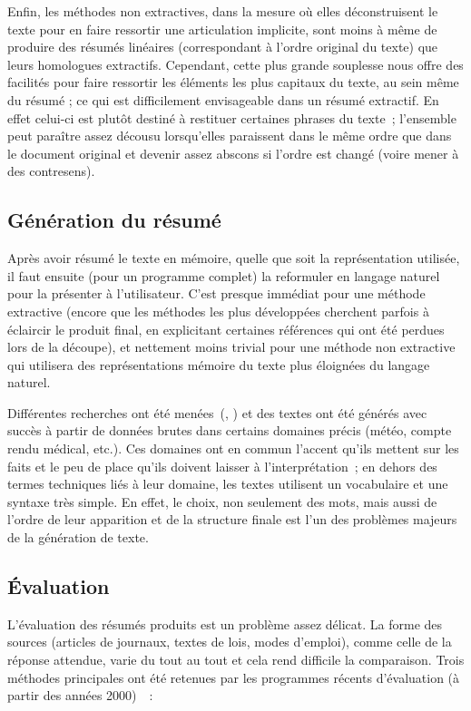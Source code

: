 \documentclass[a4paper, 12pt]{article}
\begin{document}
Enfin, les méthodes non extractives, dans la mesure où elles déconstruisent le texte pour en faire ressortir une articulation implicite, sont moins à même de produire des résumés linéaires (correspondant à l'ordre original du texte) que leurs homologues extractifs. Cependant, cette plus grande souplesse nous offre des facilités pour faire ressortir les éléments les plus capitaux du texte, au sein même du résumé ; ce qui est difficilement envisageable dans un résumé extractif. En effet celui-ci est plutôt destiné à restituer certaines phrases du texte~; l'ensemble peut paraître assez décousu lorsqu'elles paraissent dans le même ordre que dans le document original et devenir assez abscons si l'ordre est changé (voire mener à des contresens).

\subsection{Génération du résumé}

Après avoir résumé le texte en mémoire, quelle que soit la représentation utilisée, il faut ensuite (pour un programme complet) la reformuler en langage naturel pour la présenter à l'utilisateur. C'est presque immédiat pour une méthode extractive (encore que les méthodes les plus développées cherchent parfois à éclaircir le produit final, en explicitant certaines références qui ont été perdues lors de la découpe), et nettement moins trivial pour une méthode non extractive qui utilisera des représentations mémoire du texte plus éloignées du langage naturel.

Différentes recherches ont été menées~(\cite{danlos_generation_2000}, \cite{horacek_building_2001}) et des textes ont été générés avec succès à partir de données brutes dans certains domaines précis (météo, compte rendu médical, etc.). Ces domaines ont en commun l'accent qu'ils mettent sur les faits et le peu de place qu'ils doivent laisser à l'interprétation~; en dehors des termes techniques liés à leur domaine, les textes utilisent un vocabulaire et une syntaxe très simple. En effet, le choix, non seulement des mots, mais aussi de l'ordre de leur apparition et de la structure finale est l'un des problèmes majeurs de la génération de texte.

\subsection{Évaluation}

L'évaluation des résumés produits est un problème assez délicat. La forme des sources (articles de journaux, textes de lois, modes d'emploi), comme celle de la réponse attendue, varie du tout au tout et cela rend difficile la comparaison. Trois méthodes principales ont été retenues par les programmes récents d'évaluation (à partir des années 2000)~\cite[p.1453-1461]{jones_automatic_2007}~:
\end{document}
